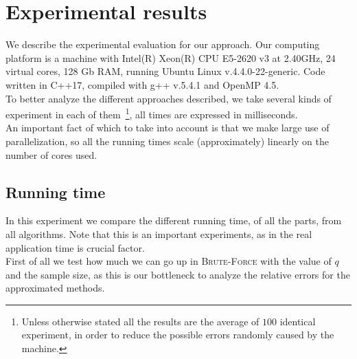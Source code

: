     \section{Experimental results}

    We describe the experimental evaluation for our approach. Our computing platform is a machine with Intel(R) Xeon(R) CPU E5-2620 v3 at 2.40GHz, 24 virtual cores, 128 Gb RAM, running Ubuntu Linux v.4.4.0-22-generic. Code written in C++17, compiled with g++ v.5.4.1 and OpenMP 4.5.\\
    
    To better analyze the different approaches described, we take several kinds of experiment in each of them~\footnote{Unless otherwise stated all the results are the average of $100$ identical experiment, in order to reduce the possible errors randomly caused by the machine.}, all times are expressed in milliseconds.\\
     
    An important fact of which to take into account is that we make large use of parallelization, 
    so all the running times scale (approximately) linearly on the number of cores used.
    
	\subsection*{Running time}
	
	In this experiment we compare the different running time, of all the parts, from all algorithms. Note that this is an important experiments, as in the real application time is crucial factor.\\

	First of all we test how much we can go up in \textsc{Brute-Force} with the value of $q$ and the sample size, as this is our bottleneck to analyze the relative errors for the approximated methods.\\ 
	
